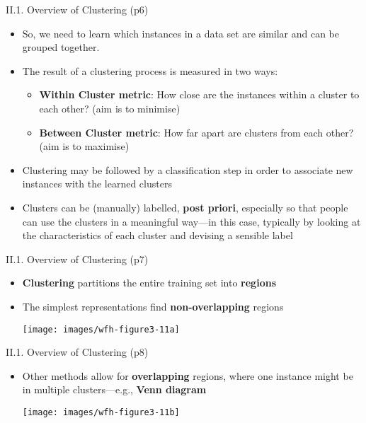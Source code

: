 \documentclass[handout]{beamer}
\newcommand{\strong}[1]{\textbf{\color{teal} #1}}
\newcommand{\stronger}[1]{\textbf{\color{purple} #1}}
\begin{document}
\begin{frame}{II.1. Overview of Clustering (p6)}
\begin{itemize}
\item So, we need to learn which instances in a data set are similar and can be grouped together.
\item The result of a clustering process is measured in two ways:
	\begin{itemize}
	\item \stronger{Within Cluster metric}: How close are the instances within a cluster to each other? (aim is to minimise)
	\item \stronger{Between Cluster metric}: How far apart are clusters from each other? (aim is to maximise)
	\end{itemize}
\item Clustering may be followed by a classification step in order to associate new instances with the learned clusters
\item Clusters can be (manually) labelled, \strong{post priori}, especially so that people can use the clusters in a meaningful way---in this case, typically by looking at the characteristics of each cluster and devising a sensible label
\end{itemize}
\end{frame}
\begin{frame}{II.1. Overview of Clustering (p7)}
\begin{itemize}
\item \stronger{Clustering} partitions the entire training set into \strong{regions}
\item The simplest representations find \strong{non-overlapping} regions
\begin{center}
\texttt{[image: images/wfh-figure3-11a]}\\
\cite[Figure 3.11a]{WFH3:2011}
\end{center}
\end{itemize}
\end{frame}
\begin{frame}{II.1. Overview of Clustering (p8)}
\begin{itemize}
\item Other methods allow for \strong{overlapping} regions, where one instance might be in multiple clusters---e.g., \stronger{Venn diagram}
\begin{center}
\texttt{[image: images/wfh-figure3-11b]}\\
\cite[Figure 3.11b]{WFH3:2011}
\end{center}
\end{itemize}
\end{frame}
\end{document}
